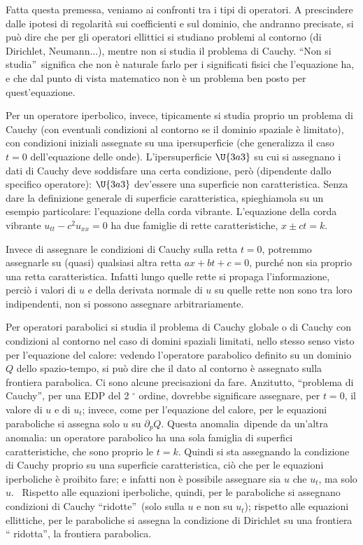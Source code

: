 \documentclass{article}
\begin{document}
Fatta questa premessa, veniamo ai confronti tra i tipi di operatori. A
prescindere dalle ipotesi di regolarit\`{a} sui coefficienti e sul dominio,
che andranno precisate, si pu\`{o} dire che per gli operatori ellittici si
studiano problemi al contorno (di Dirichlet, Neumann...), mentre non si
studia il problema di Cauchy. \textquotedblleft Non si
studia\textquotedblright\ significa che non \`{e} naturale farlo per i
significati fisici che l'equazione ha, e che dal punto di vista matematico
non \`{e} un problema ben posto per quest'equazione.

Per un operatore iperbolico, invece, tipicamente si studia proprio un
problema di Cauchy (con eventuali condizioni al contorno se il dominio
spaziale \`{e} limitato), con condizioni iniziali assegnate su una
ipersuperficie (che generalizza il caso $t=0$ dell'equazione delle onde).
L'ipersuperficie $\U{3a3} $ su cui si assegnano i dati di Cauchy deve
soddisfare una certa condizione, per\`{o} (dipendente dallo specifico
operatore): $\U{3a3} $ dev'essere una superficie non caratteristica. Senza
dare la definizione generale di superficie caratteristica, spieghiamola su
un esempio particolare: l'equazione della corda vibrante. L'equazione della
corda vibrante $u_{tt}-c%
{{}^2}%
u_{xx}=0$ ha due famiglie di rette caratteristiche, $x\pm ct=k$.

Invece di assegnare le condizioni di Cauchy sulla retta $t=0$, potremmo
assegnarle su (quasi) qualsiasi altra retta $ax+bt+c=0$, purch\'{e} non sia
proprio una retta caratteristica. Infatti lungo quelle rette si propaga
l'informazione, perci\`{o} i valori di $u$ e della derivata normale di $u$
su quelle rette non sono tra loro indipendenti, non si possono assegnare
arbitrariamente.

Per operatori parabolici si studia il problema di Cauchy globale o di Cauchy
con condizioni al contorno nel caso di domini spaziali limitati, nello
stesso senso visto per l'equazione del calore: vedendo l'operatore
parabolico definito su un dominio $Q$ dello spazio-tempo, si pu\`{o} dire
che il dato al contorno \`{e} assegnato sulla frontiera parabolica. Ci sono
alcune precisazioni da fare. Anzitutto, \textquotedblleft problema di
Cauchy\textquotedblright , per una EDP del 2%
${{}^\circ}$
ordine, dovrebbe significare assegnare, per $t=0$, il valore di $u$ e di $%
u_{t}$; invece, come per l'equazione del calore, per le equazioni
paraboliche si assegna solo $u$ su $\partial _{p}Q$. Questa anomalia\
dipende da un'altra anomalia: un operatore parabolico ha una sola famiglia
di superfici caratteristiche, che sono proprio le $t=k$. Quindi si sta
assegnando la condizione di Cauchy proprio su una superficie caratteristica,
ci\`{o} che per le equazioni iperboliche \`{e} proibito fare; e infatti non 
\`{e} possibile assegnare sia $u$ che $u_{t}$, ma solo $u$. \ Rispetto alle
equazioni iperboliche, quindi, per le paraboliche si assegnano condizioni di
Cauchy \textquotedblleft ridotte\textquotedblright\ (solo sulla $u$ e non su 
$u_{t}$); rispetto alle equazioni ellittiche, per le paraboliche si assegna
la condizione di Dirichlet su una frontiera \textquotedblleft
ridotta\textquotedblright , la frontiera parabolica.
\end{document}
